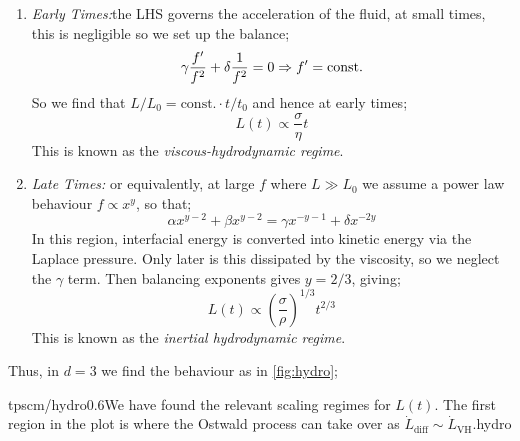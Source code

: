 \begin{enumerate}
\item \emph{Early Times:}the LHS governs the acceleration of the fluid, at small times, this is negligible so we set up the balance;
\begin{equation*}
\gamma \frac{f^{\prime}}{f^2} + \delta \frac{1}{f^2} = 0 \Rightarrow f^{\prime} = \text{const.} 
\end{equation*} 
So we find that $L/L_0 = \text{const.}\cdot t/t_0$ and hence at early times;
\begin{equation}
L(t) \propto \frac{\sigma}{\eta}t
\end{equation}
This is known as the \emph{viscous-hydrodynamic regime}.
\item \emph{Late Times:} or equivalently, at large $f$ where $L \gg L_0$ we assume a power law behaviour $f \propto x^{y}$, so that;
\begin{equation*}
\alpha x^{y - 2} + \beta x^{y - 2} = \gamma x^{-y - 1} + \delta x^{-2y}
\end{equation*}
In this region, interfacial energy is converted into kinetic energy via the Laplace pressure. Only later is this dissipated by the viscosity, so we neglect the $\gamma$ term. Then balancing exponents gives $y = 2/3$, giving;
\begin{equation}
L(t) \propto \left(\frac{\sigma}{\rho}\right)^{1/3} t^{2/3}
\end{equation}
This is known as the \emph{inertial hydrodynamic regime}. 
\end{enumerate}
Thus, in $d = 3$ we find the behaviour as in \autoref{fig:hydro};
\begin{mygraphic}{tpscm/hydro}{0.6}{We have found the relevant scaling regimes for $L(t)$. The first region in the plot is where the Ostwald process can take over as $\dot{L}_{\text{diff}} \sim \dot{L}_{\text{VH}}$.}{hydro}\end{mygraphic}
